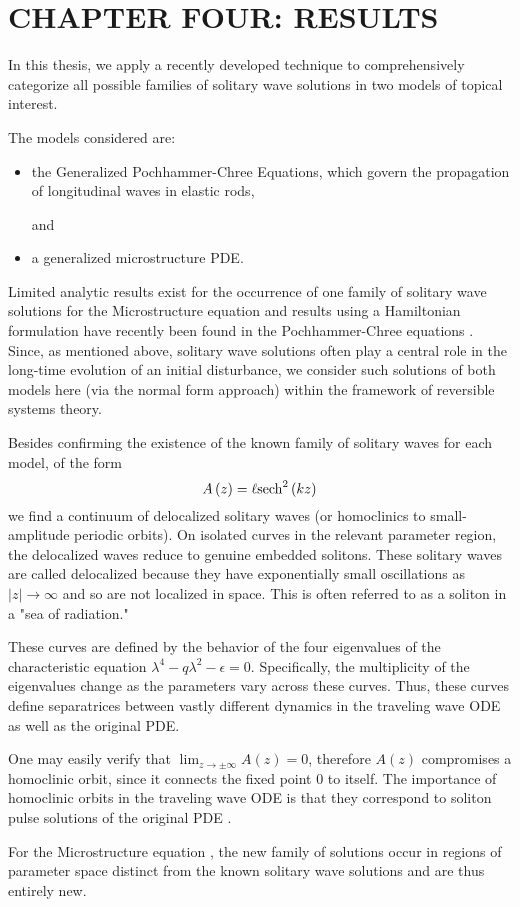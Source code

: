 \chapter{CHAPTER FOUR: RESULTS} \label{chapter_4}

In this thesis, we apply a recently developed technique to
comprehensively categorize all possible families of solitary wave
solutions in two models of topical interest.

The models considered are:
\begin{itemize}
\item the Generalized Pochhammer-Chree Equations, which  govern the propagation of longitudinal waves in elastic rods,

and

\item a generalized microstructure PDE.
\end{itemize}

Limited analytic results exist for the occurrence of one family of  solitary
wave solutions for the Microstructure equation and results using a Hamiltonian
formulation have recently been found in the Pochhammer-Chree equations \cite{LiZhang}. Since, as
mentioned above, solitary wave solutions often play a central role in the
long-time evolution of an initial disturbance, we consider such solutions of
both models here (via the normal form approach) within the framework of
reversible systems theory.

Besides confirming the existence of the known family of solitary waves for each
model, of the form
\begin{equation} 
A\left(z\right) = \ell \space \mathrm{sech}^2\left(k z\right)
\end{equation}
we find a continuum of delocalized solitary waves (or homoclinics to
small-amplitude periodic orbits).  On isolated curves in the relevant parameter
region, the delocalized waves reduce to genuine embedded solitons. 
These solitary waves are called delocalized because they have exponentially
small oscillations as $|z|\rightarrow\infty$ and so are not localized in space.
This is often referred to as a soliton in a "sea of radiation."

These curves are defined by the behavior of the four eigenvalues of the characteristic
equation $ \lambda^4 - q \lambda^2 - \epsilon =  0$. Specifically, the 
multiplicity of the eigenvalues change as the parameters vary across these curves.
Thus, these curves define separatrices between vastly different dynamics in 
the traveling wave ODE as well as the original PDE.

One may easily verify that $\lim_{z\rightarrow\pm\infty} A(z) = 0$, therefore
$A(z)$ compromises a homoclinic orbit, since it connects the fixed point $0$ to
itself. The importance of homoclinic orbits in the traveling wave ODE is that
they correspond to soliton pulse solutions of the original PDE \cite{IA}.

For the Microstructure equation , the new family of solutions occur in regions
of parameter space distinct from the known solitary wave solutions and are thus
entirely new. 

